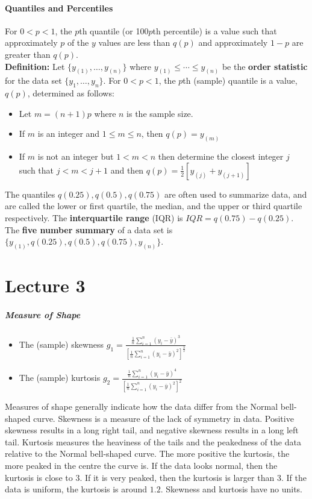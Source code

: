 \documentclass[10pt,letter]{article}
\theoremstyle{plain}
\theoremstyle{definition}
\begin{document}
\paragraph{Quantiles and Percentiles}
For $0<p<1$, the $p$th quantile (or 100$p$th percentile) is a value such that approximately $p$ of the $y$ values are less than $q(p)$ and approximately $1-p$ are greater than $q(p)$. \\ 
\textbf{Definition:} Let $\{y_{(1)},\ldots,y_{(n)}\}$ where $y_{(1)}\leq\cdots\leq y_{(n)}$ be the \textbf{order statistic} for the data set $\{y_1,\ldots,y_n\}$. For $0<p<1$, the $p$th (sample) quantile is a value, $q(p)$, determined as follows:
\begin{itemize}
    \item Let $m=(n+1)p$ where $n$ is the sample size.
    \item If $m$ is an integer and $1\leq m\leq n$, then $q(p)=y_{(m)}$ 
    \item If $m$ is not an integer but $1<m<n$ then determine the closest integer $j$ such that $j<m<j+1$ and then $q(p)=\frac{1}{2}[y_{(j)}+y_{(j+1)}]$
\end{itemize}
The quantiles $q(0.25),q(0.5),q(0.75)$ are often used to summarize data, and are called the lower or first quartile, the median, and the upper or third quartile respectively. The \textbf{interquartile range} (IQR) is $IQR=q(0.75)-q(0.25)$. The \textbf{five number summary} of a data set is $\{y_{(1)},q(0.25),q(0.5),q(0.75),y_{(n)}\}$. 

\section*{Lecture 3}
\subparagraph{Measure of Shape}
\begin{itemize}
    \item The (sample) skewness $g_1=\frac{\frac{1}{n}\sum_{i=1}^n(y_i-\bar{y})^3}{\left[\frac{1}{n}\sum_{i=1}^n(y_i-\bar{y})^2\right]^\frac{3}{2}}$ 
    \item The (sample) kurtosis $g_2=\frac{\frac{1}{n}\sum_{i=1}^n(y_i-\bar{y})^4}{\left[\frac{1}{n}\sum_{i=1}^n(y_i-\bar{y})^2\right]^2}$ 
\end{itemize}
Measures of shape generally indicate how the data differ from the Normal bell-shaped curve. Skewness is a measure of the lack of symmetry in data. Positive skewness results in a long right tail, and negative skewness results in a long left tail. Kurtosis measures the heaviness of the tails and the peakedness of the data relative to the Normal bell-shaped curve. The more positive the kurtosis, the more peaked in the centre the curve is. If the data looks normal, then the kurtosis is close to 3. If it is very peaked, then the kurtosis is larger than 3. If the data is uniform, the kurtosis is around $1.2$. Skewness and kurtosis have no units. 
\end{document}
